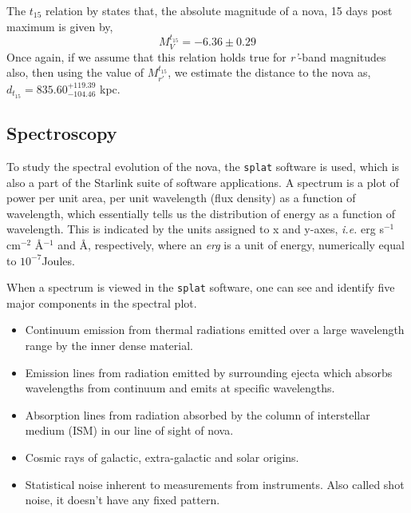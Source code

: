 \documentclass{tda}
\begin{document}
	The \(t_{15}\) relation by \citet{2003ApJ...599.1302F} states that, the absolute magnitude of a nova, 15 days post maximum is given by,
	\begin{equation}
		M_{V}^{t_{15}} = -6.36 \pm 0.29
		\label{eq:t15_mmrd}
	\end{equation}
	Once again, if we assume that this relation holds true for \textit{r'}-band magnitudes also, then using the value of \(M_{r'}^{t_{15}}\), we estimate the distance to the nova as, \(d_{t_{15}} = 835.60^{+119.39}_{-104.46}\) kpc. \\


	
	\subsection{Spectroscopy} \label{sec:spectroscopy}

	To study the spectral evolution of the nova, the \texttt{splat} software is used, which is also a part of the Starlink suite of software applications. A spectrum is a plot of power per unit area, per unit wavelength (flux density) as a function of wavelength, which essentially tells us the distribution of energy as a function of wavelength. This is indicated by the units assigned to x and y-axes, \textit{i.e.} erg s\(^{-1}\) cm\(^{-2}\) \r{A}\(^{-1}\) and \r{A}, respectively, where an \emph{erg} is a unit of energy, numerically equal to \(10^{-7}\)Joules.

	When a spectrum is  viewed in the \texttt{splat} software, one can see and identify five major components in the spectral plot.
	\begin{itemize}
		\item Continuum emission from thermal radiations emitted over a large wavelength range by the inner dense material. 
		\item Emission lines from radiation emitted by surrounding ejecta which absorbs wavelengths from continuum and emits at specific wavelengths. 
		\item Absorption lines from radiation absorbed by the column of interstellar medium (ISM) in our line of sight of nova. 
		\item Cosmic rays of galactic, extra-galactic and solar origins. 
		\item Statistical noise inherent to measurements from instruments. Also called shot noise, it doesn't have any fixed pattern.
	\end{itemize}
\end{document}
